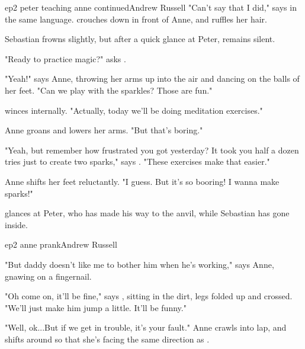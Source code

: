 \documentclass{book}
\begin{document}
\begin{childnode}{ep2 peter teaching anne continued}{Andrew Russell}
    "Can't say that I did," says \name{} in the same language. \HeShe{} crouches down in front of Anne, and ruffles her hair. 

    Sebastian frowns slightly, but after a quick glance at Peter, remains silent.

    "Ready to practice magic?" asks \name{}.

    "Yeah!" says Anne, throwing her arms up into the air and dancing on the balls of her feet. "Can we play with the sparkles? Those are fun."

    \name{} winces internally. "Actually, today we'll be doing meditation exercises."

    Anne groans and lowers her arms. "But that's boring."

    "Yeah, but remember how frustrated you got yesterday? It took you half a dozen tries just to create two sparks," says \name{}. "These exercises make that easier." 

    Anne shifts her feet reluctantly. "I guess. But it's so booring! I wanna make sparks!"

    \name{} glances at Peter, who has made his way to the anvil, while Sebastian has gone inside.



\end{childnode}


\begin{childnode}{ep2 anne prank}{Andrew Russell}

    "But daddy doesn't like me to bother him when he's working," says Anne, gnawing on a fingernail.

    "Oh come on, it'll be fine," says \name{}, sitting in the dirt, legs folded up and crossed. "We'll just make him jump a little. It'll be funny."

    "Well, ok...But if we get in trouble, it's your fault." Anne crawls into \names{} lap, and shifts around so that she's facing the same direction as \name{}.


\end{childnode}
\end{document}
